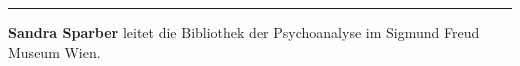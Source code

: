 \begin{center}\rule{0.5\linewidth}{0.5pt}\end{center}

\textbf{Sandra Sparber} leitet die Bibliothek der Psychoanalyse im
Sigmund Freud Museum Wien.
